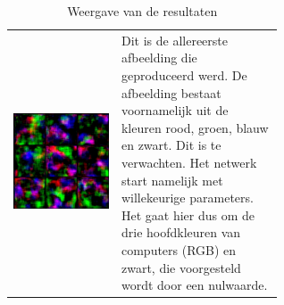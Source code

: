 \documentclass[dutch, twoside, a4paper, 10pt]{article}
\begin{document}
\newpage
\begin{table}[H]
    \centering
    \caption{Weergave van de resultaten}
    \label{Tab: weergave}
    \begin{tabular}{c p{0.6\linewidth}}
          \includegraphics[scale=0.18]{0.jpg}&  \vspace{-10\baselineskip} Dit is de allereerste afbeelding die geproduceerd werd. De afbeelding bestaat voornamelijk uit de kleuren rood, groen, blauw en zwart. Dit is te verwachten. Het netwerk start namelijk met willekeurige parameters. Het gaat hier dus om de drie hoofdkleuren van computers (RGB) en zwart, die voorgesteld wordt door een nulwaarde.\\

\end{tabular}
\end{table}
\end{document}
